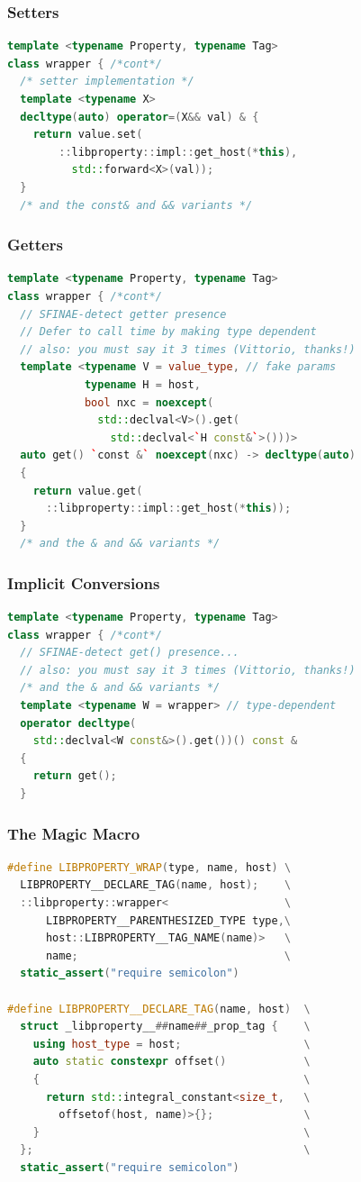 \documentclass{beamer}
\begin{document}
\begin{frame}[fragile]
\frametitle{Setters}
\begin{lstlisting}[language=cpp]
template <typename Property, typename Tag>
class wrapper { /*cont*/
  /* setter implementation */
  template <typename X>
  decltype(auto) operator=(X&& val) & {
    return value.set(
        ::libproperty::impl::get_host(*this),
          std::forward<X>(val));
  }
  /* and the const& and && variants */
\end{lstlisting}
\end{frame}

\begin{frame}[fragile]
\frametitle{Getters}
\begin{lstlisting}[language=cpp]
template <typename Property, typename Tag>
class wrapper { /*cont*/
  // SFINAE-detect getter presence
  // Defer to call time by making type dependent
  // also: you must say it 3 times (Vittorio, thanks!)
  template <typename V = value_type, // fake params
            typename H = host,
            bool nxc = noexcept(
              std::declval<V>().get(
                std::declval<`H const&`>()))>
  auto get() `const &` noexcept(nxc) -> decltype(auto) 
  {
    return value.get(
      ::libproperty::impl::get_host(*this));
  }
  /* and the & and && variants */
\end{lstlisting}
\end{frame}


\begin{frame}[fragile]
\frametitle{Implicit Conversions}
\begin{lstlisting}[language=cpp]
template <typename Property, typename Tag>
class wrapper { /*cont*/
  // SFINAE-detect get() presence...
  // also: you must say it 3 times (Vittorio, thanks!)
  /* and the & and && variants */
  template <typename W = wrapper> // type-dependent
  operator decltype(
    std::declval<W const&>().get())() const &
  {
    return get();
  }
\end{lstlisting}
\end{frame}


\begin{frame}[fragile]
\frametitle{The Magic Macro}
\begin{lstlisting}[language=cpp]
#define LIBPROPERTY_WRAP(type, name, host) \
  LIBPROPERTY__DECLARE_TAG(name, host);    \
  ::libproperty::wrapper<                  \
      LIBPROPERTY__PARENTHESIZED_TYPE type,\
      host::LIBPROPERTY__TAG_NAME(name)>   \
      name;                                \
  static_assert("require semicolon")

#define LIBPROPERTY__DECLARE_TAG(name, host)  \
  struct _libproperty__##name##_prop_tag {    \
    using host_type = host;                   \
    auto static constexpr offset()            \
    {                                         \
      return std::integral_constant<size_t,   \
        offsetof(host, name)>{};              \
    }                                         \
  };                                          \
  static_assert("require semicolon")
\end{lstlisting}
\end{frame}
\end{document}
